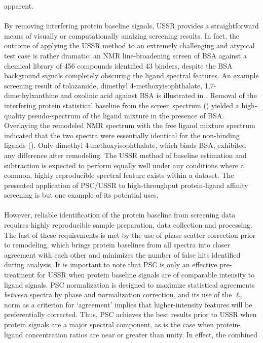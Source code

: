 \begin{doublespace}
apparent.
\\\\
By removing interfering protein baseline signals, USSR provides a
straightforward means of visually or computationally analzing screening
results. In fact, the outcome of applying the USSR method to an extremely
challenging and atypical test case is rather dramatic: an NMR line-broadening
screen of BSA against a chemical library of 456 compounds identified 43
binders, despite the BSA background signals completely obscuring the ligand
spectral features. An example screening result of tolazamide, dimethyl
4-methoxyisophthalate, 1,7-dimethylxanthine and oxolinic acid against BSA is
illustrated in . Removal of the interfering protein
statistical baseline from the screen spectrum ()
yielded a high-quality pseudo-spectrum of the ligand mixture in the presence
of BSA. Overlaying the remodeled NMR spectrum with the free ligand mixture
spectrum indicated that the two spectra were essentially identical for the
non-binding ligands (). Only
dimethyl 4-methoxyisophthalate, which binds BSA, exhibited
any difference after remodeling. The USSR method of baseline estimation and
subtraction is expected to perform equally well under any conditions where a
common, highly reproducible spectral feature exists within a dataset. The
presented application of PSC/USSR to high-throughput protein-ligand affinity
screening is but one example of its potential uses.
\\\\
However, reliable identification of the protein baseline from screening data
requires highly reproducible sample preparation, data collection and
processing. The last of these requirements is met by the use of phase-scatter
correction prior to remodeling, which brings protein baselines from all spectra
into closer agreement with each other and minimizes the number of false hits
identified during analysis. It is important to note that PSC is only an
effective pre-treatment for USSR when protein baseline signals are of
comparable intensity to ligand signals. PSC normalization is designed to
maximize statistical agreements \emph{between} spectra by phase and
normalization correction, and its use of the $\ell_2$ norm as a criterion for
`agreement' implies that higher-intensity features will be preferentially
corrected. Thus, PSC achieves the best results prior to USSR when protein
signals are a major spectral component, as is the case when protein-ligand
concentration ratios are near or greater than unity. In effect, the combined

\end{doublespace}
